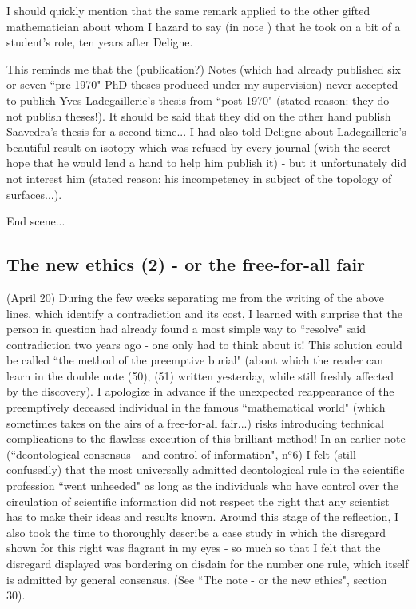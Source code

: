 \label{note:57}
I should quickly mention that the same remark applied to the other
gifted mathematician about whom I hazard to say (in note ) that he took
on a bit of a student's role, ten years after Deligne.

\label{note:58} This reminds me that the (publication?) Notes (which had already published six or seven ``pre-1970" PhD theses produced under my supervision) never accepted to publich Yves Ladegaillerie's thesis from ``post-1970" (stated reason: they do not publish theses!). It should be said that they did on the other hand publish Saavedra's thesis for a second time... I had also told Deligne about Ladegaillerie's beautiful result on isotopy which was refused by every journal (with the secret hope that he would lend a hand to help him publish it) - but it unfortunately did not interest him (stated reason: his incompetency in subject of the topology of surfaces...).

End scene...

\subsection{The new ethics (2) - or the free-for-all fair}

\label{note:59} (April 20) During the few weeks separating me from the writing of the above lines, which identify a contradiction and its cost, I learned with surprise that the person in question had already found a most simple way to ``resolve" said contradiction two years ago - one only had to think about it! This solution could be called ``the method of the preemptive burial" (about which the reader can learn in the double note (50), (51) written yesterday, while still freshly affected by the discovery). I apologize in advance if the unexpected reappearance of the preemptively deceased individual in the famous ``mathematical world" (which sometimes takes on the airs of a free-for-all fair...) risks introducing technical complications to the flawless execution of this brilliant method! In an earlier note (``deontological consensus - and control of information", n$^o 6$) I felt (still confusedly) that the most universally admitted deontological rule in the scientific profession ``went unheeded" as long as the individuals who have control over the circulation of scientific information did not respect the right that any scientist has to make their ideas and results known. Around this stage of the reflection, I also took the time to thoroughly describe a case study in which the disregard shown for this right was flagrant in my eyes - so much so that I felt that the disregard displayed was bordering on disdain for the number one rule, which itself is admitted by general consensus. (See ``The note - or the new ethics", section 30).

